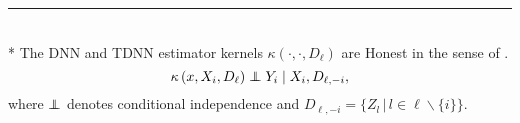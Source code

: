 \hrule

\begin{lem}\label{lem:honesty}\mbox{}\\*
	The DNN and TDNN estimator kernels $\kappa\left(\cdot, \cdot, D_{\ell}\right)$ are Honest in the sense of \citet{wager_estimation_2018}.
	\begin{equation*}
		\kappa\left(x, X_{i}, D_{\ell}\right) \perp\!\!\!\!\perp Y_{i} \mid X_{i}, D_{\ell,-i},
	\end{equation*}
	where $\perp\!\!\!\!\perp$ denotes conditional independence and $D_{\ell,-i} = \{Z_l \, | \, l \in \ell \backslash \{i\}\}$.
\end{lem}
